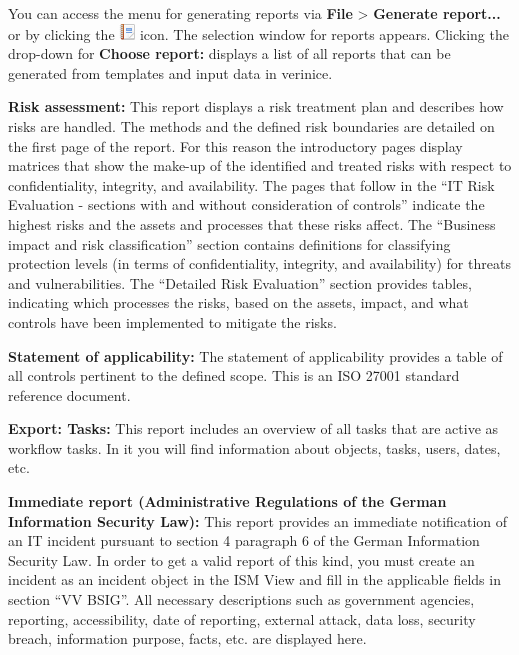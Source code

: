 \documentclass[a4paper,10pt]{book}
\begin{document}
You can access the menu for generating reports via \textbf{File} \textgreater
\textbf{Generate report...} or by clicking the
\includegraphics[height=2ex]{Icon/Report.png} icon. The selection window for
reports appears. Clicking the drop-down for \textbf{Choose report:} displays a
list of all reports that can be generated from templates and input data in
verinice.

\textbf{Risk assessment:} This report displays a risk treatment plan and
describes how risks are handled. The methods and the defined risk boundaries are
detailed on the first page of the report. For this reason the introductory pages
display matrices that show the make-up of the identified and treated risks with
respect to confidentiality, integrity, and availability. The pages that follow
in the ``IT Risk Evaluation - sections with and without consideration of
controls'' indicate the highest risks and the assets and processes that these
risks affect. The ``Business impact and risk classification'' section contains
definitions for classifying protection levels (in terms of confidentiality,
integrity, and availability) for threats and vulnerabilities. The ``Detailed
Risk Evaluation'' section provides tables, indicating which processes the risks,
based on the assets, impact, and what controls have been implemented to mitigate
the risks.

\textbf{Statement of applicability:} The statement of applicability provides a
table of all controls pertinent to the defined scope. This is an ISO 27001
standard reference document.

\textbf{Export: Tasks:} This report includes an overview of all tasks that are
active as workflow tasks. In it you will find information about objects, tasks,
users, dates, etc.

\textbf{Immediate report (Administrative Regulations of the German Information
Security Law):} This report provides an immediate notification of an IT incident
pursuant to section 4 paragraph 6 of the German Information Security Law. In
order to get a valid report of this kind, you must create an incident as an
incident object in the ISM View and fill in the applicable fields in section
``VV BSIG''. All necessary descriptions such as government agencies, reporting,
accessibility, date of reporting, external attack, data loss, security breach,
information purpose, facts, etc. are displayed here.
\end{document}
